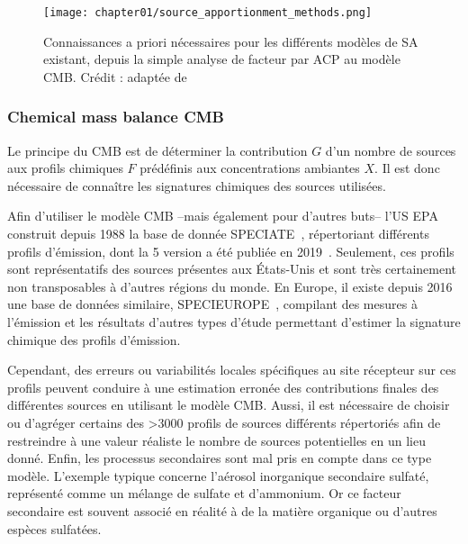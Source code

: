 \begin{figure}[ht]
    \centering
    \texttt{[image: chapter01/source\_apportionment\_methods.png]}
    \caption{
        Connaissances a priori nécessaires pour les différents modèles de SA existant,
        depuis la simple analyse de facteur par ACP au modèle CMB. Crédit :
        \cite{vianaSource2008} adaptée de \cite{schauerCharacterization2006}
    }%
    \label{fig:chapter01/source_apportionment_methods}
\end{figure}

\subsubsection{Chemical mass balance CMB}%
\label{ssub:chemical_mass_balance_cmb}

Le principe du CMB est de déterminer la contribution $G$ d'un nombre de sources
aux profils chimiques $F$ prédéfinis aux concentrations ambiantes $X$. Il est donc
nécessaire de connaître les signatures chimiques des sources utilisées.

Afin d'utiliser le modèle CMB --mais également pour d'autres buts-- l'US EPA construit
depuis 1988 la base de donnée SPECIATE~\autocite{simonDevelopment2010}, répertoriant
différents profils d'émission, dont la 5\ieme{}
version a été publiée en 2019~\autocite{u.s.environmentalprotectionagencySPECIATE2019}.
Seulement, ces profils sont représentatifs des sources présentes aux États-Unis et sont
très certainement non transposables à d'autres régions du monde.
En Europe, il existe depuis 2016 une base de données similaire,
SPECIEUROPE~\autocite{pernigottiSPECIEUROPE2016}, compilant des mesures à l'émission et
les résultats d'autres types d'étude permettant d'estimer la signature chimique des
profils d'émission.

Cependant, des erreurs ou variabilités locales spécifiques au site récepteur sur ces
profils peuvent conduire à une estimation erronée des contributions finales des
différentes sources en utilisant le modèle CMB.
Aussi, il est nécessaire de choisir ou d'agréger certains des >3000 profils de sources
différents répertoriés afin de restreindre à une valeur réaliste le nombre de sources
potentielles en un lieu donné.
Enfin, les processus secondaires sont mal pris en compte dans ce type modèle. L'exemple typique
concerne l'aérosol inorganique secondaire sulfaté, représenté comme un mélange de sulfate
et d'ammonium. Or ce facteur secondaire est souvent associé en réalité à de la matière
organique ou d'autres espèces sulfatées.


